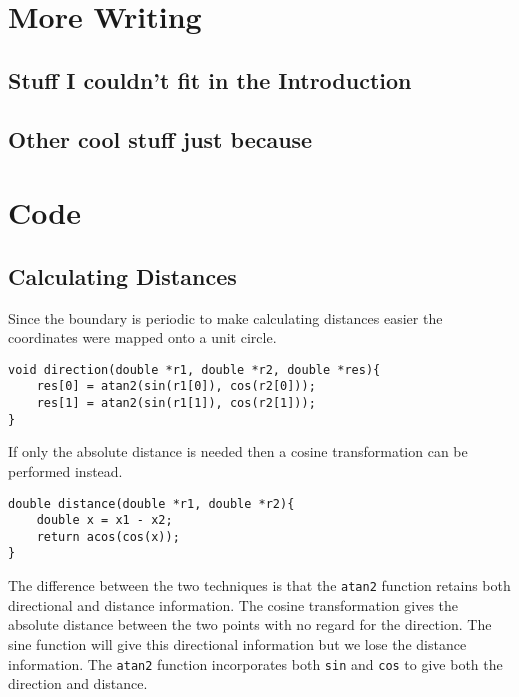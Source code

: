 \backmatter

\chapter{More Writing}

\section{Stuff I couldn't fit in the Introduction}

\section{Other cool stuff just because}

\chapter{Code}

\section{Calculating Distances}
\label{sec:calc distances}

Since the boundary is periodic to make calculating distances easier the coordinates were mapped onto a unit circle. 

\begin{lstlisting}[language=myc]
void direction(double *r1, double *r2, double *res){
    res[0] = atan2(sin(r1[0]), cos(r2[0]));
    res[1] = atan2(sin(r1[1]), cos(r2[1]));
}
\end{lstlisting}

If only the absolute distance is needed then a cosine transformation can be performed instead.

\begin{lstlisting}[language=myc]
double distance(double *r1, double *r2){
    double x = x1 - x2;
    return acos(cos(x));
}
\end{lstlisting}

The difference between the two techniques is that the \lstinline$atan2$ function retains both directional and distance information. The cosine transformation gives the absolute distance between the two points with no regard for the direction. The sine function will give this directional information but we lose the distance information. The \lstinline$atan2$ function incorporates both \lstinline$sin$ and \lstinline$cos$ to give both the direction and distance.


